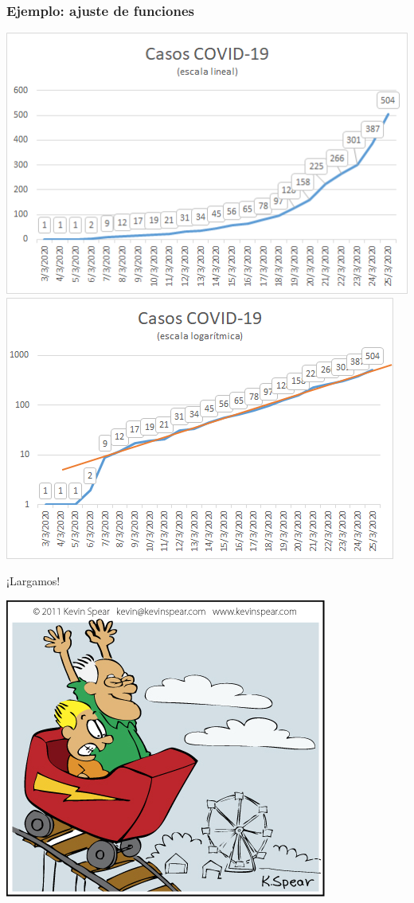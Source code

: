 \documentclass[aspectratio=169,12pt]{beamer}
\begin{document}
\begin{frame}
\frametitle{Ejemplo: ajuste de funciones}

\begin{center}
\includegraphics[scale=.35]{01-ET_lyftWoAA-gFt.png}
\includegraphics[scale=.35]{01-ET_l3SQXsAUhAKA.png}
\end{center}

\end{frame}



\begin{frame}

\begin{center}
¡Largamos!

\includegraphics[scale=.5]{seatbelt.jpg}


\end{center}

\end{frame}

\end{document}
